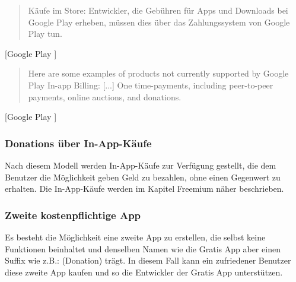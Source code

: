 \documentclass[FIPLY_base.tex]{subfiles}
\begin{document}
\begin{quote}
Käufe im Store: Entwickler, die Gebühren für Apps und Downloads bei Google Play erheben, müssen dies über das Zahlungssystem von Google Play tun.
\end{quote}[Google Play \cite{gpDevContentPolicy}]

\begin{quote}
Here are some examples of products not currently supported by Google Play In-app Billing: [...]
One time-payments, including peer-to-peer payments, online auctions, and donations.
\end{quote}[Google Play \cite{gpInAppBilling}]
\ \\
\subsubsection{Donations über In-App-Käufe}
Nach diesem Modell werden In-App-Käufe zur Verfügung gestellt, die dem Benutzer die Möglichkeit geben Geld zu bezahlen, ohne einen Gegenwert zu erhalten. 
Die In-App-Käufe werden im Kapitel Freemium näher beschrieben.
\ \\
\subsubsection{Zweite kostenpflichtige App}
Es besteht die Möglichkeit eine zweite App zu erstellen, die selbst keine Funktionen beinhaltet und denselben Namen wie die Gratis App aber einen Suffix wie z.B.: (Donation) trägt.
In diesem Fall kann ein zufriedener Benutzer diese zweite App kaufen und so die Entwickler der Gratis App unterstützen.
\end{document}
